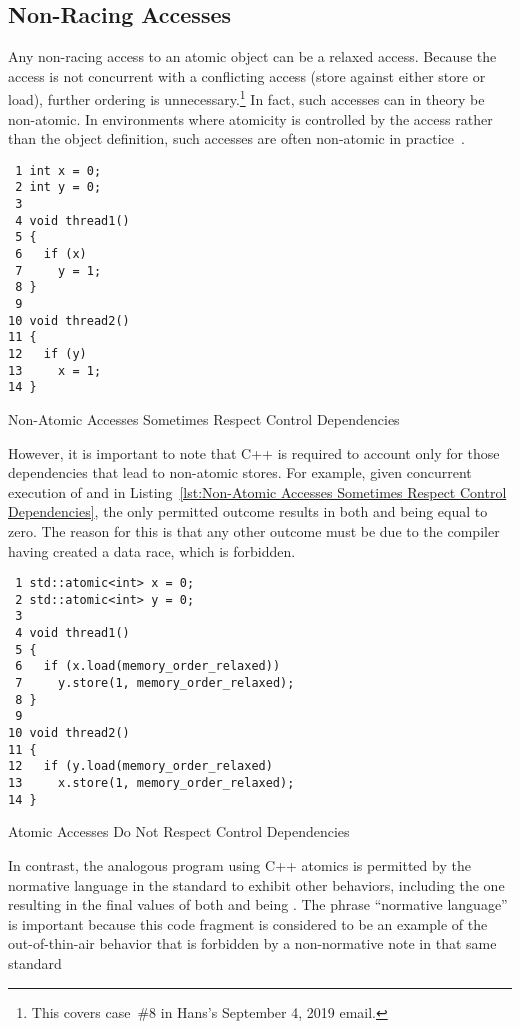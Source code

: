 \documentclass[10]{article}
\begin{document}
\subsection{Non-Racing Accesses}
\label{sec:Non-Racing Accesses}

Any non-racing access to an atomic object can be a relaxed access.
Because the access is not concurrent with a conflicting access (store
against either store or load), further ordering is unnecessary.\footnote{
	This covers case~\#8 in Hans's September 4, 2019 email.}
In fact, such accesses can in theory be non-atomic.
In environments where atomicity is controlled by the access rather
than the object definition, such accesses are often non-atomic in
practice~\cite{JadeAlglave2019WhoAfraidCompiler}.

\begin{listing}[tbp]
\begin{verbatim}
 1 int x = 0;
 2 int y = 0;
 3
 4 void thread1()
 5 {
 6   if (x)
 7     y = 1;
 8 }
 9
10 void thread2()
11 {
12   if (y)
13     x = 1;
14 }
\end{verbatim}
\caption{Non-Atomic Accesses Sometimes Respect Control Dependencies}
\label{lst:Non-Atomic Accesses Sometimes Respect Control Dependencies}
\end{listing}

However, it is important to note that C++ is required to account only
for those dependencies that lead to non-atomic stores.
For example, given concurrent execution of  and
 in
Listing~\ref{lst:Non-Atomic Accesses Sometimes Respect Control Dependencies},
the only permitted outcome results in both  and  being
equal to zero.
The reason for this is that any other outcome must be due to the compiler
having created a data race, which is forbidden.

\begin{listing}[tbp]
\begin{verbatim}
 1 std::atomic<int> x = 0;
 2 std::atomic<int> y = 0;
 3
 4 void thread1()
 5 {
 6   if (x.load(memory_order_relaxed))
 7     y.store(1, memory_order_relaxed);
 8 }
 9
10 void thread2()
11 {
12   if (y.load(memory_order_relaxed)
13     x.store(1, memory_order_relaxed);
14 }
\end{verbatim}
\caption{Atomic Accesses Do Not Respect Control Dependencies}
\label{lst:Atomic Accesses Do Not Respect Control Dependencies}
\end{listing}

In contrast, the analogous program using C++ atomics is permitted
by the normative language in the standard to exhibit other behaviors,
including the one resulting in the final values of both  and
 being .
The phrase ``normative language'' is important because this code fragment
is considered to be an example of the out-of-thin-air behavior that is
forbidden by a non-normative note in that same standard
\end{document}
